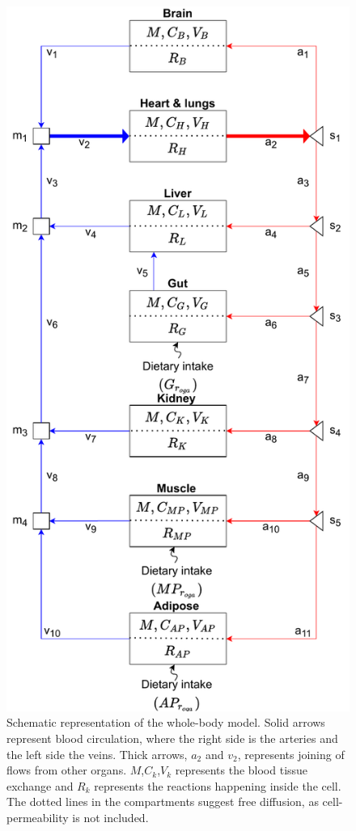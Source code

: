 \documentclass{IEEEtran}
\begin{document}
\begin{figure}[H]
    \centering
    \includegraphics[width=0.82\columnwidth, keepaspectratio]{Diagrams/Bendsen_Carstensen_Flow_v4.pdf}
    \caption{Schematic representation of the whole-body model. Solid arrows represent blood circulation, where the right side is the arteries and the left side the veins.
    Thick arrows, $a_2$ and $v_2$, represents joining of flows from other organs.
    $M$,$C_k$,$V_k$ represents the blood tissue exchange and $R_k$ represents the reactions happening inside the cell. The dotted lines in the compartments suggest free diffusion, as cell-permeability is not included.}
    \label{fig:Bends_cars_flow_diagram}
\end{figure}
\end{document}
